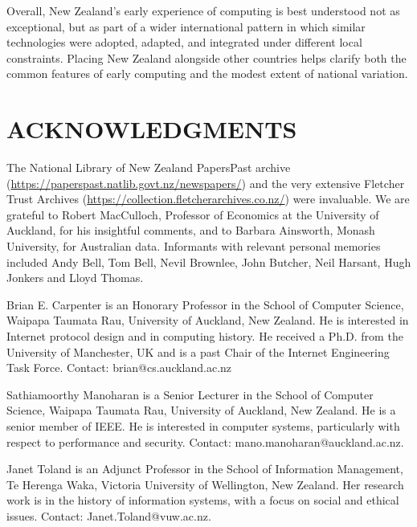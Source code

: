 \documentclass{IEEEcsmag}
\begin{document}
Overall, New Zealand's early experience of computing is best understood not as exceptional, but as part of a wider international pattern in which similar technologies were adopted, adapted, and integrated under different local constraints. Placing New Zealand alongside other countries helps clarify both the common features of early computing and the modest extent of national variation.
\cbend
\vspace*{-8pt}
\section{ACKNOWLEDGMENTS}
The National Library of New Zealand PapersPast archive
(\href{https://paperspast.natlib.govt.nz/newspapers}{https://paperspast.natlib.govt.nz/newspapers/})
and the very extensive Fletcher Trust Archives
(\href{https://collection.fletcherarchives.co.nz/}{https://collection.fletcherarchives.co.nz/}) were invaluable.
We are grateful to Robert MacCulloch, Professor of Economics at the University of Auckland, for his
insightful comments, 
\cbstart
and to Barbara Ainsworth, Monash University, for Australian data.
Informants with relevant
personal memories included Andy Bell, Tom Bell, Nevil Brownlee,
John Butcher, Neil Harsant, Hugh {Jonkers\textdagger}  and Lloyd Thomas.
\cbend




\begin{IEEEbiography}{Brian E. Carpenter} is an Honorary Professor in the School of Computer Science, Waipapa Taumata Rau, University of Auckland, New Zealand. He is interested in Internet protocol design and in computing history. He received a Ph.D. from the University of Manchester, UK and is a past Chair of the Internet Engineering Task Force. Contact: brian@cs.auckland.ac.nz\vspace*{8pt}
\end{IEEEbiography}

\begin{IEEEbiography}{Sathiamoorthy Manoharan} is a Senior Lecturer in the School of Computer Science, Waipapa Taumata Rau, University of Auckland, New Zealand.
He is a senior member of IEEE. He is interested in computer systems, particularly with respect to performance and security. Contact: mano.manoharan@auckland.ac.nz.\vspace*{8pt}
\end{IEEEbiography}

\begin{IEEEbiography}{Janet Toland} is an Adjunct Professor in the School of Information Management,
Te Herenga Waka, Victoria University of Wellington, New Zealand. Her research work is in the history of
information systems, with a focus on social and ethical issues. Contact: Janet.Toland@vuw.ac.nz.\vspace*{8pt}
\end{IEEEbiography}
\end{document}
